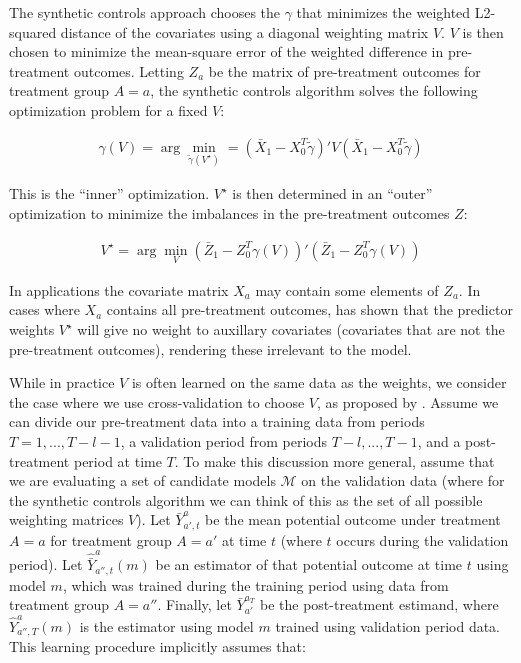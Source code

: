 The synthetic controls approach chooses the $\gamma$ that minimizes the weighted L2-squared distance of the covariates using a diagonal weighting matrix $V$. $V$ is then chosen to minimize the mean-square error of the weighted difference in pre-treatment outcomes. Letting $Z_a$ be the matrix of pre-treatment outcomes for treatment group $A = a$, the synthetic controls algorithm solves the following optimization problem for a fixed $V$:

\begin{align}
\gamma(V) = \arg\min_{\tilde{\gamma}(V^\star)} = (\bar{X}_1 - X_0^T\tilde{\gamma})'V(\bar{X}_1 - X_0^T\tilde{\gamma}) 
\end{align}

This is the ``inner'' optimization. $V^\star$ is then determined in an ``outer'' optimization to minimize the imbalances in the pre-treatment outcomes $Z$:

\begin{align}
    V^\star = \arg\min_V (\bar{Z}_1 - Z_0^T\gamma(V))'(\bar{Z}_1 - Z_0^T\gamma(V))
\end{align}

In applications the covariate matrix $X_a$ may contain some elements of $Z_a$. In cases where $X_a$ contains all pre-treatment outcomes, \cite{kaul2015synthetic} has shown that the predictor weights $V^\star$ will give no weight to auxillary covariates (covariates that are not the pre-treatment outcomes), rendering these irrelevant to the model. 

While in practice $V$ is often learned on the same data as the weights, we consider the case where we use cross-validation to choose $V$, as proposed by \cite{abadie2015comparative}. Assume we can divide our pre-treatment data into a training data from periods $T = 1, ..., T - l - 1$, a validation period from periods $T - l, ..., T - 1$, and a post-treatment period at time $T$. To make this discussion more general, assume that we are evaluating a set of candidate models $\mathcal{M}$ on the validation data (where for the synthetic controls algorithm we can think of this as the set of all possible weighting matrices $V$). Let $\bar{Y}^a_{a', t}$ 
be the mean potential outcome under treatment $A = a$ for treatment group $A = a'$ at time $t$ (where $t$ occurs during the validation period). Let $\hat{\bar{Y}}^a_{a'', t}(m)$ be an estimator of that potential outcome at time $t$ using model $m$, which was trained during the training period using data from treatment group $A = a''$. Finally, let $\bar{Y}_{a'}^{a_T}$ be the post-treatment estimand, where $\hat{Y}^a_{a'', T}(m)$ is the estimator using model $m$ trained using validation period data. This learning procedure implicitly assumes that:

